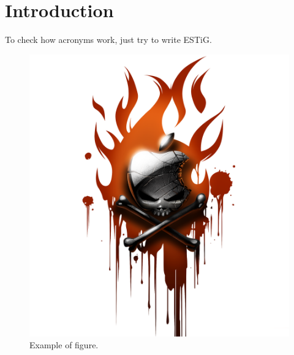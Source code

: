 \chapter{Introduction}\label{cap:intro}

To check how acronyms work, just try to write \gls{ESTiG}.

\lipsum[1-3]

\begin{figure}[htbp]
    \begin{center}
    \includegraphics[scale=0.05]{images/imagem01}
    \end{center}
    \caption{Example of figure.}
    \label{fig:graficosubscricoesmoveis}
\end{figure}

